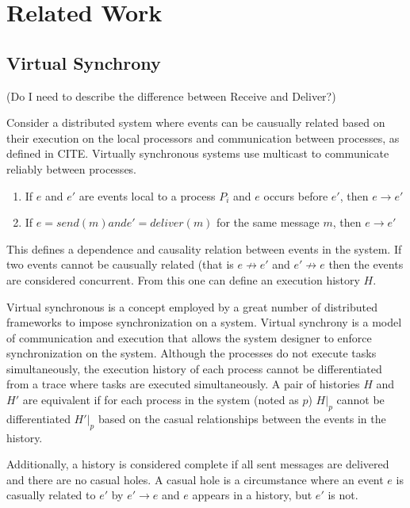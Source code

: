 \chapter{Related Work}

\section{Virtual Synchrony}

(Do I need to describe the difference between Receive and Deliver?)

Consider a distributed system where events can be causually related based
on their execution on the local processors and communication between
processes, as defined in CITE. Virtually synchronous systems use multicast
to communicate reliably between processes.

\begin{enumerate}
    \item If $e$ and $e'$ are events local to a process $P_{i}$ and $e$ occurs before $e'$, then $e \rightarrow e'$
    \item If $e = send(m) and e'=deliver(m)$ for the same message $m$, then $e \rightarrow e'$
\end{enumerate}

This defines a dependence and causality relation between events in the system.
If two events cannot be causually related (that is $e \not\rightarrow e'$ and
$e' \not\rightarrow e$ then the events are considered concurrent. From this
one can define an execution history $H$.

Virtual synchronous is a concept employed by a great number of distributed
frameworks to impose synchronization on a system. Virtual synchrony is a
model of communication and execution that allows the system designer to
enforce synchronization on the system. Although the processes do not
execute tasks simultaneously, the execution history of each process cannot
be differentiated from a trace where tasks are executed simultaneously. A
pair of histories $H$ and $H'$ are equivalent if for each process in the
system (noted as $p$) $H|_{p}$ cannot be differentiated $H'|_{p}$ based
on the casual relationships between the events in the history.

Additionally, a history is considered complete if all sent messages are
delivered and there are no casual holes. A casual hole is a circumstance
where an event $e$ is casually related to $e'$ by $e' \rightarrow e$ and
$e$ appears in a history, but $e'$ is not. 

